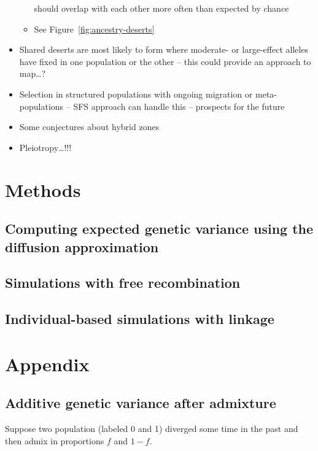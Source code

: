 \documentclass{article}
\begin{document}
\begin{itemize}
\begin{itemize}
                should overlap with each other more often than expected by chance
            \item See Figure~\ref{fig:ancestry-deserts}
        \end{itemize}
    \item Shared deserts are most likely to form where moderate- or large-effect
        alleles have fixed in one population or the other -- this could provide
        an approach to map\dots?
    \item Selection in structured populations with ongoing migration or
        meta-populations -- SFS approach can handle this -- prospects for the
        future
    \item Some conjectures about hybrid zones
    \item Pleiotropy\dots!!!
\end{itemize}

\section*{Methods}

\subsection*{Computing expected genetic variance using the diffusion approximation}

\subsection*{Simulations with free recombination}

\subsection*{Individual-based simulations with linkage}




\section{Appendix}

\subsection{Additive genetic variance after admixture}

Suppose two population (labeled 0 and 1) diverged some time in the past and
then admix in proportions $f$ and $1-f$.
\end{document}
